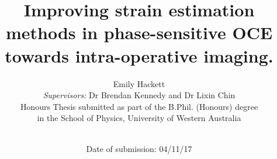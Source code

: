 \begin{titlepage}
\title{Improving strain estimation methods in phase-sensitive OCE towards intra-operative imaging.}
\author{Emily Hackett \\
{{\it Supervisors:} Dr Brendan Kennedy and Dr Lixin Chin}\\
{Honours Thesis submitted as part of the B.Phil. (Honours) degree} \\ {in the School of Physics, University of Western Australia}\\ \\}
\date{Date of submission: 04/11/17}
\maketitle
\end{titlepage}


